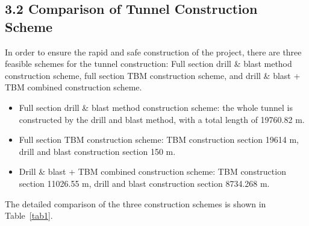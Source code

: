 \documentclass[11pt]{article}
\begin{document}
\subsection*{3.2 Comparison of Tunnel Construction Scheme}

In order to ensure the rapid and safe construction of the project, there are three feasible schemes for the tunnel construction: Full section drill \& blast method construction scheme, full section TBM construction scheme, and drill \& blast + TBM combined construction scheme.

\begin{itemize}
    \item Full section drill \& blast method construction scheme: the whole tunnel is constructed by the drill and blast method, with a total length of 19760.82 m.
    \item Full section TBM construction scheme: TBM construction section 19614 m, drill and blast construction section 150 m.
    \item Drill \& blast + TBM combined construction scheme: TBM construction section 11026.55 m, drill and blast construction section 8734.268 m.
\end{itemize}

The detailed comparison of the three construction schemes is shown in Table~\ref{tab1}.
\end{document}
